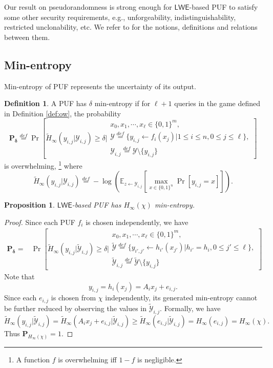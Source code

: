\documentclass[12pt]{article}
\newcommand{\eqdef}{\stackrel{def}{=}}
\newcommand{\bits}{\{0,1\}}
\newcommand{\Ex}{\mathbb{E}}
\newcommand{\LWE}{\mathsf{LWE}}
\newtheorem{proposition}[theorem]{Proposition}
\theoremstyle{definition}
\newtheorem{definition}[theorem]{Definition}
\begin{document}
Our result on pseudorandomness is strong enough for $\LWE$-based PUF to satisfy some other security requirements, e.g., unforgeability, indistinguishability, restricted unclonability, etc. We refer to \cite{sadeghi2016towards} for the notions, definitions and relations between them.

\subsection{Min-entropy}
Min-entropy of PUF represents the uncertainty of its output.
\begin{definition}
A PUF has $\delta$ min-entropy if for $\ell+1$ queries in the game defined in Definition \ref{def:ow}, the probability
$$\mathbf{P_\delta} \eqdef
\Pr \left[\tilde{H}_{\infty}(y_{i,j} | \mathcal{Y}_{i,j})\geq \delta \bigg| 
\begin{array}{c}
x_0, x_1, \cdots, x_\ell \in \bits^m, \\
\mathcal{Y} \eqdef \{y_{i,j} \gets f_i(x_j) | 1\leq i \leq n, 0\leq j \leq \ell \}, \\
\mathcal{Y}_{i,j} \eqdef \mathcal{Y} \setminus \{y_{i,j}\}
\end{array}\right]$$
is overwhelming, \footnote{A function $f$ is overwhelming iff $1-f$ is negligible.} where 
$$\tilde{H}_{\infty}(y_{i,j} | \mathcal{Y}_{i,j}) \eqdef -\log \left( \Ex_{z \gets \mathcal{Y}_{i,j}} \left[\max_{x\in\bits^n}\Pr[y_{i,j} = x] \right]\right ).$$
\end{definition}

\begin{proposition}
$\LWE$-based PUF has $H_{\infty}(\chi)$ min-entropy.
\end{proposition}
\begin{proof}
Since each PUF $f_i$ is chosen independently, we have
$$\begin{aligned}
\mathbf{P_\delta} 
=& \Pr \left[\tilde{H}_{\infty}(y_{i,j} | \widetilde{\mathcal{Y}}_{i,j})\geq \delta \bigg| 
\begin{array}{c}
x_0, x_1, \cdots, x_\ell \in \bits^m, \\
\widetilde{\mathcal{Y}} \eqdef \{y_{i',j'} \gets h_{i'}(x_{j'}) | h_{i'} = h_i, 0\leq j' \leq \ell \}, \\
\widetilde{\mathcal{Y}}_{i,j} \eqdef \widetilde{\mathcal{Y}} \setminus \{y_{i,j}\}
\end{array}\right]
\end{aligned}$$
Note that 
$$y_{i,j} = h_i(x_j) = A_ix_j + e_{i,j}.$$
Since each $e_{i,j}$ is chosen from $\chi$ independently, its generated min-entropy cannot be further reduced by observing the values in $\widetilde{\mathcal{Y}}_{i,j}$. Formally, we have
$$\tilde{H}_{\infty}(y_{i,j} | \widetilde{\mathcal{Y}}_{i,j}) 
=\tilde{H}_{\infty}(A_ix_j + e_{i,j} | \widetilde{\mathcal{Y}}_{i,j}) 
\geq \tilde{H}_{\infty}(e_{i,j} | \widetilde{\mathcal{Y}}_{i,j}) 
= H_{\infty}(e_{i,j}) = H_{\infty}(\chi). $$
Thus $\mathbf{P}_{H_{\infty}(\chi)} = 1$.
\end{proof}
\end{document}
